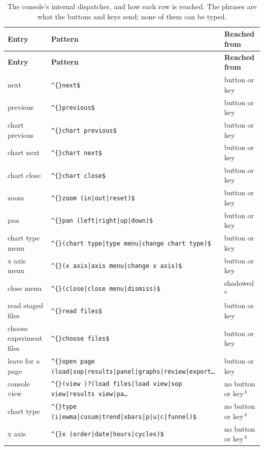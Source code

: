 {\small
\begin{xltabular}{\linewidth}{|X|l|l|}
\caption{The console's internal dispatcher, and how each row is reached. The
phrases are what the buttons and keys send; none of them can be
typed.}\label{tab:console-commands} \\
\toprule \textbf{Entry} & \textbf{Pattern} & \textbf{Reached from} \\\midrule\endfirsthead
\toprule \textbf{Entry} & \textbf{Pattern} & \textbf{Reached from} \\\midrule\endhead
next & \texttt{\textasciicircum\{\}next\$} & button or key \\
previous & \texttt{\textasciicircum\{\}previous\$} & button or key \\
chart previous & \texttt{\textasciicircum\{\}chart previous\$} & button or key \\
chart next & \texttt{\textasciicircum\{\}chart next\$} & button or key \\
chart close & \texttt{\textasciicircum\{\}chart close\$} & button or key \\
zoom & \texttt{\textasciicircum\{\}zoom (in|out|reset)\$} & button or key \\
pan & \texttt{\textasciicircum\{\}pan (left|right|up|down)\$} & button or key \\
chart type menu & \texttt{\textasciicircum\{\}(chart type|type menu|change chart type)\$} & button or key \\
x axis menu & \texttt{\textasciicircum\{\}(x axis|axis menu|change x axis)\$} & button or key \\
close menu & \texttt{\textasciicircum\{\}(close|close menu|dismiss)\$} & shadowed\,$^{a}$ \\
read staged files & \texttt{\textasciicircum\{\}read files\$} & button or key \\
choose experiment files & \texttt{\textasciicircum\{\}choose files\$} & button or key \\
leave for a page & \texttt{\textasciicircum\{\}open page (load|sop|results|panel|graphs|review|export\ldots{}} & button or key \\
console view & \texttt{\textasciicircum\{\}(view )?(load files|load view|sop view|results view|pa\ldots{}} & no button or key\,$^{b}$ \\
chart type & \texttt{\textasciicircum\{\}type (i|ewma|cusum|trend|xbars|p|u|c|funnel)\$} & no button or key\,$^{b}$ \\
x axis & \texttt{\textasciicircum\{\}x (order|date|hours|cycles)\$} & no button or key\,$^{b}$ \\

\end{xltabular}}
